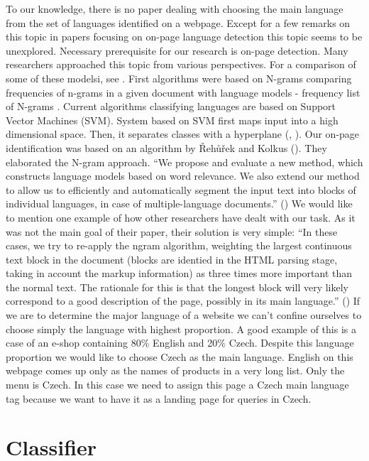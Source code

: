 \documentclass{acm_proc_article-sp}
\begin{document}
  To our knowledge, there is no paper dealing with choosing the main language from the set
  of languages identified on a webpage. Except for a few remarks on this topic in papers 
  focusing on on-page language detection this topic seems to be unexplored. 
  Necessary prerequisite for our research is on-page detection. Many researchers approached this topic
  from various perspectives. For a comparison of some of these modelsi, see \cite{Baldwin:shortlong}. 
  First algorithms were based on N-grams comparing frequencies of n-grams in a given document with 
  language models - frequency list of N-grams \cite{trenkle:ngram}. Current algorithms classifying languages 
  are based on Support Vector Machines (SVM). System based on SVM first maps input into a high dimensional space. 
  Then, it separates classes with a hyperplane (\cite{Campbell:supportvector}, \cite{Lodhi:textclass}).
  Our on-page identification was based on an algorithm by Řehůřek and Kolkus (\cite{Rehurek:languageidentification}).  They elaborated the N-gram approach. 
  “We propose and evaluate a new method, which constructs language models based on word relevance. We also 
  extend our method to allow us to efficiently and automatically segment the input text into blocks of individual 
  languages, in case of multiple-language documents.” (\cite{Rehurek:languageidentification})
  We would like to mention one example of how other researchers have dealt with our task. As it was not the main goal of 
  their paper, their solution is very simple:
  “In these cases, we try to re-apply the ngram algorithm, weighting the largest continuous text block in the document 
  (blocks are identied in the HTML parsing stage, taking in account the markup information) as three times more important 
  than the normal text. The rationale for this is that the longest block will very likely correspond to a good description 
  of the page, possibly in its main language.” (\cite{Martins:langidentweb}) If we are to determine the major language of a website 
  we can’t confine ourselves to choose simply the language with highest proportion. A good example of this is a case of an e-shop 
  containing 80\% English and 20\% Czech. Despite this language proportion we would like to choose Czech as the main language. 
  English on this webpage comes up only as the names of products in a very long list. Only the menu is Czech. In this case 
  we need to assign this page a Czech main language tag because we want to have it as a landing page for queries in Czech.


  \section{Classifier}
\end{document}
